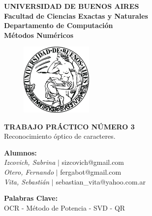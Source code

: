 \documentclass[10pt, a4paper]{article}
\begin{document}
\thispagestyle{empty}
\begin{center}

\Huge{ \bf{UNIVERSIDAD DE BUENOS AIRES}}
\\
\LARGE{\bf{Facultad de Ciencias Exactas y Naturales}}
\\
\textbf{Departamento de Computaci\'on}
\\
\textbf{M\'etodos Num\'ericos}
\vspace{2.0\baselineskip}
\end{center}


\begin{figure}[h] %
\begin{center}
\includegraphics[width=100pt]{./image.jpeg}
\end{center}
\end{figure}
\begin{center}
\vspace*{0.7cm}

\huge{\bf TRABAJO PR\'ACTICO N\'UMERO 3}\\
\huge{Reconocimiento óptico de caracteres.}
\vspace*{2cm}

\end{center}

\LARGE {\textbf{Alumnos:}}\\
\Large{\textsl{Izcovich, Sabrina} $|$ sizcovich@gmail.com}\\
\Large{\textsl{Otero, Fernando} \hspace{0.1cm}$|$ fergabot@gmail.com}\\
\Large{\textsl{Vita, Sebasti\'an} \hspace{0.37cm}$|$ sebastian\_vita@yahoo.com.ar}
\vspace{0.6cm}

\LARGE {\textbf{Palabras Clave:}}\\
\large {OCR - Método de Potencia - SVD - QR}
\vspace*{0.7cm}
\end{document}
